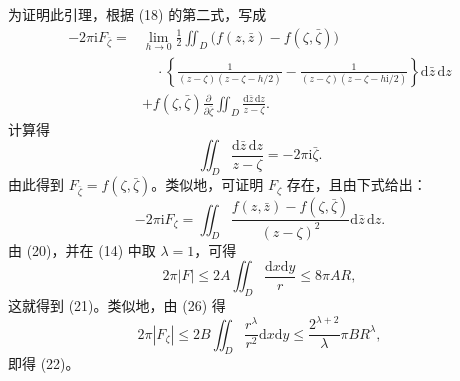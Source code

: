 \documentclass[UTF8,a4paper,11pt,fontset=fandol]{ctexart}
\newcommand{\dd}{\mathrm d}
\newcommand{\ii}{\mathrm i}
\newcommand{\dz}{\dd\bar z\,\dd z}
\newcommand{\zz}{\bar\zeta}
\begin{document}
为证明此引理，根据 (18) 的第二式，写成
\begin{align*}
-2\pi\ii F_{\bar\zeta}={}&\lim_{h\to0}\frac12\iint_D\bigl(f(z,\bar z)-f(\zeta,\zz)\bigr)\\
&\quad\cdot\left\{\frac1{(z-\zeta)(z-\zeta-h/2)}-\frac1{(z-\zeta)(z-\zeta-h\ii/2)}\right\}\dz\\
&+f(\zeta,\zz)\frac{\partial}{\partial\bar\zeta}\iint_D\frac{\dz}{z-\zeta}.
\end{align*}
计算得
\begin{equation}\iint_D\frac{\dz}{z-\zeta}=-2\pi\ii\bar\zeta.\tag{25}\end{equation}
由此得到 $F_{\bar\zeta}=f(\zeta,\zz)$。类似地，可证明 $F_\zeta$ 存在，且由下式给出：
\begin{equation}-2\pi\ii F_\zeta=\iint_D\frac{f(z,\bar z)-f(\zeta,\zz)}{(z-\zeta)^2}\dz.\tag{26}\end{equation}
由 (20)，并在 (14) 中取 $\lambda=1$，可得
\[2\pi|F|\le2A\iint_D\frac{\dd x\dd y}{r}\le8\pi AR,\]
这就得到 (21)。类似地，由 (26) 得
\[2\pi|F_\zeta|\le2B\iint_D\frac{r^\lambda}{r^2}\dd x\dd y\le\frac{2^{\lambda+2}}\lambda\pi BR^\lambda,\]
即得 (22)。
\end{document}
